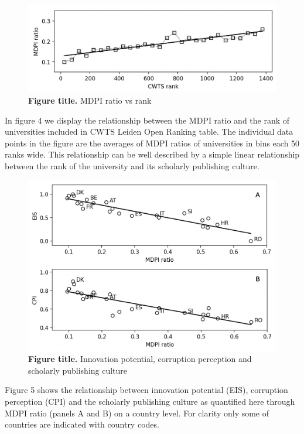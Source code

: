 \documentclass[amsfonts, amssymb, prl, superscriptaddress, notitlepage, twocolumn, nofootinbib]{revtex4-2}
\begin{document}
\begin{figure}
    \centering
    \includegraphics[width=1.0\linewidth]{Fig03.png}
    \caption{\label{fig:fig3} {\bf Figure title.} MDPI ratio vs rank  
}
\end{figure}

In figure 4 we display the relationship between the MDPI ratio and the rank of universities included in CWTS Leiden Open Ranking table. The individual data points in the figure are the averages of MDPI ratios of universities in bins each 50 ranks wide. This relationship can be well described by a simple linear relationship between the rank of the university and its scholarly publishing culture.  

\begin{figure}
    \centering
    \includegraphics[width=1.0\linewidth]{Fig04.png}
    \caption{\label{fig:fig4} {\bf Figure title.} Innovation potential, corruption perception and scholarly publishing culture  
}
\end{figure}

Figure 5 shows the relationship between innovation potential (EIS), corruption perception (CPI) and the scholarly publishing culture as quantified here through MDPI ratio (panels A and B) on a country level. For clarity only some of countries are indicated with country codes.
\end{document}
